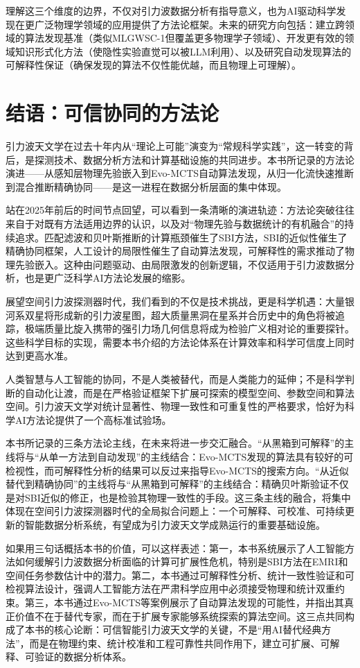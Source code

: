 理解这三个维度的边界，不仅对引力波数据分析有指导意义，也为AI驱动科学发现在更广泛物理学领域的应用提供了方法论框架。未来的研究方向包括：建立跨领域的算法发现基准（类似MLGWSC-1但覆盖更多物理学子领域）、开发更有效的领域知识形式化方法（使隐性实验直觉可以被LLM利用）、以及研究自动发现算法的可解释性保证（确保发现的算法不仅性能优越，而且物理上可理解）。

\section{结语：可信协同的方法论}

引力波天文学在过去十年内从“理论上可能”演变为“常规科学实践”，这一转变的背后，是探测技术、数据分析方法和计算基础设施的共同进步。本书所记录的方法论演进——从感知层物理先验嵌入到Evo-MCTS自动算法发现，从归一化流快速推断到混合推断精确协同——是这一进程在数据分析层面的集中体现。

站在2025年前后的时间节点回望，可以看到一条清晰的演进轨迹：方法论突破往往来自于对既有方法适用边界的认识，以及对“物理先验与数据统计的有机融合”的持续追求。匹配滤波和贝叶斯推断的计算瓶颈催生了SBI方法，SBI的近似性催生了精确协同框架，人工设计的局限性催生了自动算法发现，可解释性的需求推动了物理先验嵌入。这种由问题驱动、由局限激发的创新逻辑，不仅适用于引力波数据分析，也是更广泛科学AI方法论发展的缩影。

展望空间引力波探测器时代，我们看到的不仅是技术挑战，更是科学机遇：大量银河系双星将形成新的引力波星图，超大质量黑洞在星系并合历史中的角色将被追踪，极端质量比旋入携带的强引力场几何信息将成为检验广义相对论的重要探针。这些科学目标的实现，需要本书介绍的方法论体系在计算效率和科学可信度上同时达到更高水准。

人类智慧与人工智能的协同，不是人类被替代，而是人类能力的延伸；不是科学判断的自动化让渡，而是在严格验证框架下扩展可探索的模型空间、参数空间和算法空间。引力波天文学对统计显著性、物理一致性和可重复性的严格要求，恰好为科学AI方法论提供了一个高标准试验场。

本书所记录的三条方法论主线，在未来将进一步交汇融合。“从黑箱到可解释”的主线将与“从单一方法到自动发现”的主线结合：Evo-MCTS发现的算法具有较好的可检视性，而可解释性分析的结果可以反过来指导Evo-MCTS的搜索方向。“从近似替代到精确协同”的主线将与“从黑箱到可解释”的主线结合：精确贝叶斯验证不仅是对SBI近似的修正，也是检验其物理一致性的手段。这三条主线的融合，将集中体现在空间引力波探测器时代的全局拟合问题上：一个可解释、可校准、可持续更新的智能数据分析系统，有望成为引力波天文学成熟运行的重要基础设施。

如果用三句话概括本书的价值，可以这样表述：第一，本书系统展示了人工智能方法如何缓解引力波数据分析面临的计算可扩展性危机，特别是SBI方法在EMRI和空间任务参数估计中的潜力。第二，本书通过可解释性分析、统计一致性验证和可检视算法设计，强调人工智能方法在严肃科学应用中必须接受物理和统计双重约束。第三，本书通过Evo-MCTS等案例展示了自动算法发现的可能性，并指出其真正价值不在于替代专家，而在于扩展专家能够系统探索的算法空间。这三点共同构成了本书的核心论断：可信智能引力波天文学的关键，不是“用AI替代经典方法”，而是在物理约束、统计校准和工程可靠性共同作用下，建立可扩展、可解释、可验证的数据分析体系。

